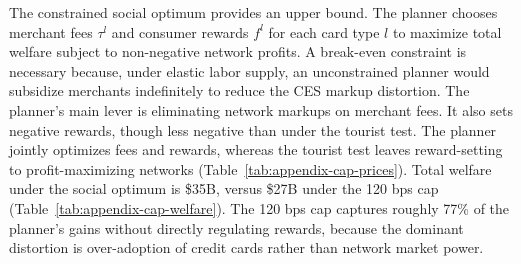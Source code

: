 \documentclass[main.tex]{subfiles}
\begin{document}
The constrained social optimum provides an upper bound.
The planner chooses merchant fees $\tau^l$ and consumer rewards $f^l$ for each card type $l$ to maximize total welfare subject to non-negative network profits.
A break-even constraint is necessary because, under elastic labor supply, an unconstrained planner would subsidize merchants indefinitely to reduce the CES markup distortion.
The planner's main lever is eliminating network markups on merchant fees. It also sets negative rewards, though less negative than under the tourist test. The planner jointly optimizes fees and rewards, whereas the tourist test leaves reward-setting to profit-maximizing networks (Table~\ref{tab:appendix-cap-prices}).
Total welfare under the social optimum is \$35B, versus \$27B under the 120 bps cap (Table~\ref{tab:appendix-cap-welfare}).
The 120 bps cap captures roughly 77\% of the planner's gains without directly regulating rewards, because the dominant distortion is over-adoption of credit cards rather than network market power.

\begin{table}[ht!]
    \caption{Effects of Fee Caps on Prices and Shares}
    \label{tab:appendix-cap-prices}
    \centering
    \small{
    
    }
\end{table}

\begin{table}[ht!]
    \caption{Welfare Effects of Fee Caps}
    \label{tab:appendix-cap-welfare}
    \centering
    \small{
    
    }
\end{table}
\end{document}
